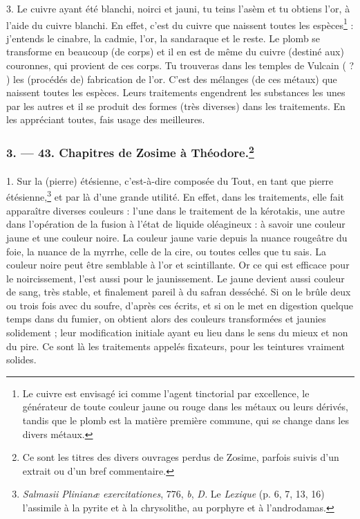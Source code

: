 \documentclass[a4paper, 11pt, oneside, polutonikogreek, french]{article}
\begin{document}
3. Le cuivre ayant été blanchi, noirci et jauni, tu teins l'asèm et tu obtiens l'or, à l'aide du cuivre blanchi. En effet, c'est du cuivre que naissent toutes les espèces\footnote{Le cuivre est envisagé ici comme l'agent tinctorial par excellence, le générateur de toute couleur jaune ou rouge dans les métaux ou leurs dérivés, tandis que le plomb est la matière première commune, qui se change dans les divers métaux.} : j'entends le cinabre, la cadmie, l'or, la sandaraque et le reste. Le plomb se transforme en beaucoup (de corps) et il en est de même du cuivre (destiné aux) couronnes, qui provient de ces corps. Tu trouveras dans les temples de Vulcain ( ? ) les (procédés de) fabrication de l'or. C'est des mélanges (de ces métaux) que naissent toutes les espèces. Leurs traitements engendrent les substances les unes par les autres et il se produit des formes (très diverses) dans les traitements. En les appréciant toutes, fais usage des meilleures.

\bigskip
\centerline{\EightStarTaper}
\centerline{\EightStarTaper\EightStarTaper}
\bigskip

\subsubsection[3. --- 43. Chapitres de Zosime à Théodore.]{3. --- 43. Chapitres de Zosime à Théodore.\footnote{Ce sont les titres des divers ouvrages perdus de Zosime, parfois suivis d'un extrait ou d'un bref commentaire.}}
\paragraph{}
1. Sur la (pierre) étésienne, c'est-à-dire composée du Tout, en tant que pierre étésienne,\footnote{\emph{Salmasii Plinianæ exercitationes}, 776, \emph{b}, \emph{D.} Le \emph{Lexique} (p. 6, 7, 13, 16) l'assimile à la pyrite et à la chrysolithe, au porphyre et à l'androdamas.} et par là d'une grande utilité. En effet, dans les traitements, elle fait apparaître diverses couleurs : l'une dans le traitement de la kérotakis, une autre dans l'opération de la fusion à l'état de liquide oléagineux : à savoir une couleur jaune et une couleur noire. La couleur jaune varie depuis la nuance rougeâtre du foie, la nuance de la myrrhe, celle de la cire, ou toutes celles que tu sais. La couleur noire peut être semblable à l'or et scintillante. Or ce qui est efficace pour le noircissement, l'est aussi pour le jaunissement. Le jaune devient aussi couleur de sang, très stable, et finalement pareil à du safran desséché. Si on le brûle deux ou trois fois avec du soufre, d'après ces écrits, et si on le met en digestion quelque temps dans du fumier, on obtient alors des couleurs transformées et jaunies solidement ; leur modification initiale ayant eu lieu dans le sens du mieux et non du pire. Ce sont là les traitements appelés fixateurs, pour les teintures vraiment solides.
\end{document}
